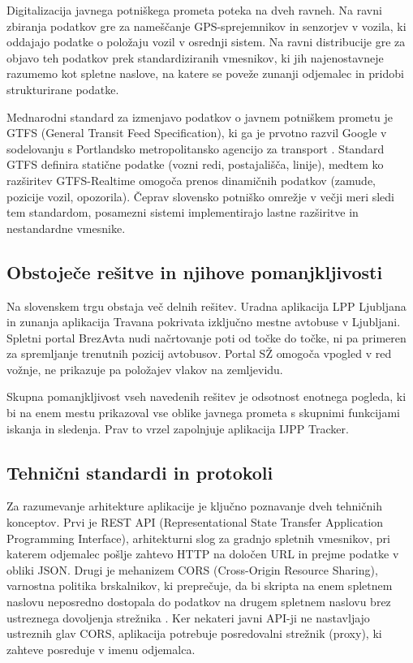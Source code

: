 \documentclass[12pt]{article}
\begin{document}
Digitalizacija javnega potniškega prometa poteka na dveh ravneh. Na ravni zbiranja podatkov gre za nameščanje GPS-sprejemnikov in senzorjev v vozila, ki oddajajo podatke o položaju vozil v osrednji sistem. Na ravni distribucije gre za objavo teh podatkov prek standardiziranih vmesnikov, ki jih najenostavneje razumemo kot spletne naslove, na katere se poveže zunanji odjemalec in pridobi strukturirane podatke.

Mednarodni standard za izmenjavo podatkov o javnem potniškem prometu je GTFS (General Transit Feed Specification), ki ga je prvotno razvil Google v sodelovanju s Portlandsko metropolitansko agencijo za transport \cite{gtfs}. Standard GTFS definira statične podatke (vozni redi, postajališča, linije), medtem ko razširitev GTFS-Realtime omogoča prenos dinamičnih podatkov (zamude, pozicije vozil, opozorila). Čeprav slovensko potniško omrežje v večji meri sledi tem standardom, posamezni sistemi implementirajo lastne razširitve in nestandardne vmesnike.

\subsection{Obstoječe rešitve in njihove pomanjkljivosti}

Na slovenskem trgu obstaja več delnih rešitev. Uradna aplikacija LPP Ljubljana \cite{lppapp} in zunanja aplikacija Travana pokrivata izključno mestne avtobuse v Ljubljani. Spletni portal BrezAvta \cite{ijppweb} nudi načrtovanje poti od točke do točke, ni pa primeren za spremljanje trenutnih pozicij avtobusov. Portal SŽ \cite{szweb} omogoča vpogled v red vožnje, ne prikazuje pa položajev vlakov na zemljevidu.

Skupna pomanjkljivost vseh navedenih rešitev je odsotnost enotnega pogleda, ki bi na enem mestu prikazoval vse oblike javnega prometa s skupnimi funkcijami iskanja in sledenja. Prav to vrzel zapolnjuje aplikacija IJPP Tracker.

\subsection{Tehnični standardi in protokoli}

Za razumevanje arhitekture aplikacije je ključno poznavanje dveh tehničnih konceptov. Prvi je REST API (Representational State Transfer Application Programming Interface), arhitekturni slog za gradnjo spletnih vmesnikov, pri katerem odjemalec pošlje zahtevo HTTP na določen URL in prejme podatke v obliki JSON. Drugi je mehanizem CORS (Cross-Origin Resource Sharing), varnostna politika brskalnikov, ki preprečuje, da bi skripta na enem spletnem naslovu neposredno dostopala do podatkov na drugem spletnem naslovu brez ustreznega dovoljenja strežnika \cite{cors}. Ker nekateri javni API-ji ne nastavljajo ustreznih glav CORS, aplikacija potrebuje posredovalni strežnik (proxy), ki zahteve posreduje v imenu odjemalca.
\end{document}
